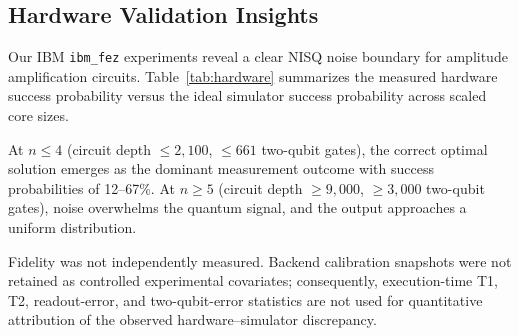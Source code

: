 \documentclass[conference]{IEEEtran} \IEEEoverridecommandlockouts
\begin{document}
\subsection{Hardware Validation Insights}

Our IBM \texttt{ibm\_fez} experiments reveal a clear NISQ noise boundary for amplitude amplification circuits. Table~\ref{tab:hardware} summarizes the measured hardware success probability versus the ideal simulator success probability across scaled core sizes.

\begin{table}[htbp]
\caption{IBM Hardware Results vs. Simulator Success Probability}
\label{tab:hardware}
\begin{center}
\end{center}
\end{table}

At $n \leq 4$ (circuit depth $\leq 2{,}100$, $\leq 661$ two-qubit gates), the correct optimal solution emerges as the dominant measurement outcome with success probabilities of 12--67\%. At $n \geq 5$ (circuit depth $\geq 9{,}000$, $\geq 3{,}000$ two-qubit gates), noise overwhelms the quantum signal, and the output approaches a uniform distribution.

Fidelity was not independently measured. Backend calibration snapshots were not retained as controlled experimental covariates; consequently, execution-time T1, T2, readout-error, and two-qubit-error statistics are not used for quantitative attribution of the observed hardware--simulator discrepancy.
\end{document}
